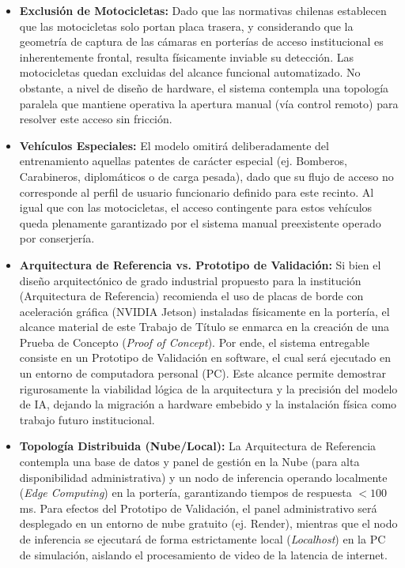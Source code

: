 \begin{itemize}
    \item \textbf{Exclusión de Motocicletas:} Dado que las normativas chilenas establecen que las motocicletas solo portan placa trasera, y considerando que la geometría de captura de las cámaras en porterías de acceso institucional es inherentemente frontal, resulta físicamente inviable su detección. Las motocicletas quedan excluidas del alcance funcional automatizado. No obstante, a nivel de diseño de hardware, el sistema contempla una topología paralela que mantiene operativa la apertura manual (vía control remoto) para resolver este acceso sin fricción.
    \item \textbf{Vehículos Especiales:} El modelo omitirá deliberadamente del entrenamiento aquellas patentes de carácter especial (ej. Bomberos, Carabineros, diplomáticos o de carga pesada), dado que su flujo de acceso no corresponde al perfil de usuario funcionario definido para este recinto. Al igual que con las motocicletas, el acceso contingente para estos vehículos queda plenamente garantizado por el sistema manual preexistente operado por conserjería.
    \item \textbf{Arquitectura de Referencia vs. Prototipo de Validación:} Si bien el diseño arquitectónico de grado industrial propuesto para la institución (Arquitectura de Referencia) recomienda el uso de placas de borde con aceleración gráfica (NVIDIA Jetson) instaladas físicamente en la portería, el alcance material de este Trabajo de Título se enmarca en la creación de una Prueba de Concepto (\textit{Proof of Concept}). Por ende, el sistema entregable consiste en un Prototipo de Validación en software, el cual será ejecutado en un entorno de computadora personal (PC). Este alcance permite demostrar rigurosamente la viabilidad lógica de la arquitectura y la precisión del modelo de IA, dejando la migración a hardware embebido y la instalación física como trabajo futuro institucional.
    \item \textbf{Topología Distribuida (Nube/Local):} La Arquitectura de Referencia contempla una base de datos y panel de gestión en la Nube (para alta disponibilidad administrativa) y un nodo de inferencia operando localmente (\textit{Edge Computing}) en la portería, garantizando tiempos de respuesta $<100$ ms. Para efectos del Prototipo de Validación, el panel administrativo será desplegado en un entorno de nube gratuito (ej. Render), mientras que el nodo de inferencia se ejecutará de forma estrictamente local (\textit{Localhost}) en la PC de simulación, aislando el procesamiento de video de la latencia de internet.

\end{itemize}
